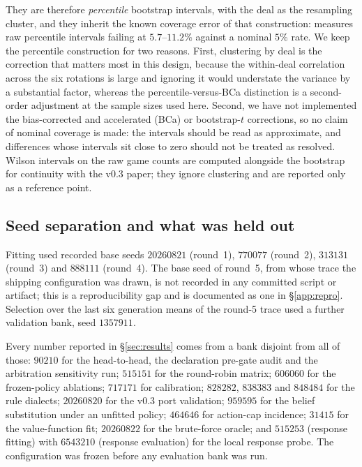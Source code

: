 They are therefore \emph{percentile} bootstrap intervals, with the deal as the
resampling cluster, and they inherit the known coverage error of that
construction: \cite{jordan-rleval} measures raw percentile intervals failing at
$5.7$--$11.2\%$ against a nominal $5\%$ rate. We keep the percentile
construction for two reasons. First, clustering by deal is the correction that
matters most in this design, because the within-deal correlation across the six
rotations is large and ignoring it would understate the variance by a
substantial factor, whereas the percentile-versus-BCa distinction is a
second-order adjustment at the sample sizes used here. Second, we have not
implemented the bias-corrected and accelerated (BCa) or bootstrap-$t$
corrections, so no claim of nominal coverage is made: the intervals should be
read as approximate, and differences whose intervals sit close to zero should not
be treated as resolved. Wilson intervals on the raw game counts are computed
alongside the bootstrap for continuity with the v0.3 paper; they ignore
clustering and are reported only as a reference point.

\subsection{Seed separation and what was held out}
\label{sec:protocol-seeds}

Fitting used recorded base seeds $20260821$ (round~1), $770077$ (round~2),
$313131$ (round~3) and $888111$ (round~4). The base seed of round~5, from
whose trace the shipping configuration was drawn, is not recorded in any
committed script or artifact; this is a reproducibility gap and is documented
as one in \S\ref{app:repro}. Selection over the last six generation means of
the round-5 trace used a further validation bank, seed $1357911$.

Every number reported in \S\ref{sec:results} comes from a bank disjoint from
all of those: $90210$ for the head-to-head, the declaration pre-gate audit and
the arbitration sensitivity run; $515151$ for the round-robin matrix; $606060$
for the frozen-policy ablations; $717171$ for calibration; $828282$, $838383$
and $848484$ for the rule dialects; $20260820$ for the v0.3 port validation;
$959595$ for the belief substitution under an unfitted policy; $464646$ for
action-cap incidence; $31415$ for the value-function fit; $20260822$ for the
brute-force oracle; and $515253$ (response fitting) with $6543210$ (response
evaluation) for the local response probe. The configuration was frozen before
any evaluation bank was run.

